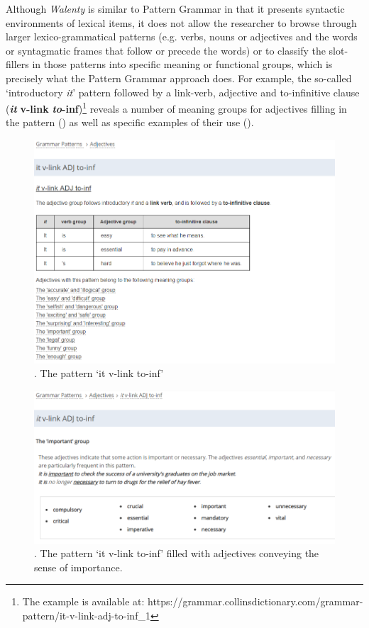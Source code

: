 \documentclass[output=paper]{langscibook}
\begin{document}
Although \textit{Walenty} is similar to Pattern Grammar in that it presents syntactic environments of lexical items, it does not allow the researcher to browse through larger lexico-grammatical patterns (e.g. verbs, nouns or adjectives and the words or syntagmatic frames that follow or precede the words) or to classify the slot-fillers in those patterns into specific meaning or functional groups, which is precisely what the Pattern Grammar approach does. For example, the so-called ‘introductory \textit{it}’ pattern followed by a link-verb, adjective and to-infinitive clause (\textbf{\textit{it}} \textbf{v-link} \textbf{{\ADJ}} \textbf{\textit{to}}\textbf{{}-inf})\footnote{\textrm{The example is available at: https://grammar.collinsdictionary.com/grammar-pattern/it-v-link-adj-to-inf\_1}} reveals a number of meaning groups for adjectives filling in the pattern () as well as specific examples of their use ().

  
\begin{figure}
\includegraphics[width=\textwidth]{figures/grabowski-img002.png}
 \caption{\label{fig:grabowski:2}. The pattern ‘it v-link {\ADJ} to-inf’}
\end{figure}

\begin{figure}
\includegraphics[width=\textwidth]{figures/grabowski-img003.png}
 \caption{\label{fig:grabowski:3}. The pattern ‘it v-link {\ADJ} to-inf’ filled with adjectives conveying the sense of importance.}
 \end{figure}
\end{document}
